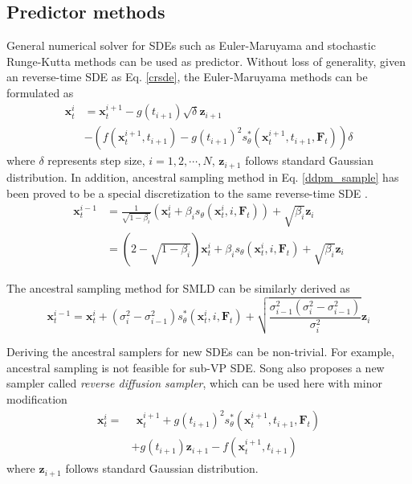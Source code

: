 \subsection{Predictor methods}\label{pred_md}
General numerical solver for SDEs such as Euler-Maruyama and stochastic Runge-Kutta methods can be used as predictor. Without loss of generality, given an reverse-time SDE as Eq. \ref{crsde}, the Euler-Maruyama methods can be formulated as
\begin{equation}\label{euler}
	\begin{aligned}
		\textbf{x}_{t}^{i} &= \textbf{x}_{t}^{i+1} - g(t_{i+1})\sqrt{\delta} \textbf{z}_{i+1}\\
		 &- (f(\textbf{x}_t^{i+1}, t_{i+1}) - g(t_{i+1})^2 s_{\theta}^*(\textbf{x}_t^{i+1}, t_{i+1}, \textbf{F}_t)) \delta
	\end{aligned}
\end{equation}
where $\delta$ represents step size, $i=1,2,\cdots, N$, $\textbf{z}_{i+1}$ follows standard Gaussian distribution.	 In addition, ancestral sampling method in Eq. \ref{ddpm_sample} has been proved to be a special discretization to the same reverse-time SDE \cite{song2020score}.
\begin{equation}\label{ances_vp}
	\begin{aligned}
	\textbf{x}_t^{i-1}&=\frac{1}{\sqrt{1-\beta_i}}(\textbf{x}_t^i + \beta_i s_{\theta}(\textbf{x}_t^i, i, \textbf{F}_t)) + \sqrt{\beta_i}\textbf{z}_i\\
	&=(2-\sqrt{1-\beta_{i}})\textbf{x}_t^{i} + \beta_{i}s_{\theta}(\textbf{x}_t^i, i, \textbf{F}_t) + \sqrt{\beta_{i}}\textbf{z}_i
	\end{aligned}
\end{equation}

The ancestral sampling method for SMLD can be similarly derived as 
\begin{equation}\label{ances_ve}
	\textbf{x}_t^{i-1} = \textbf{x}_t^{i} + (\sigma_i^2 - \sigma_{i-1}^2) s_{\theta}^*(\textbf{x}_t^{i}, i, \textbf{F}_t) + \sqrt{\frac{\sigma_{i-1}^2(\sigma_i^2-\sigma_{i-1}^2)}{\sigma_i^2}} \textbf{z}_{i}
\end{equation}

Deriving the ancestral samplers for new SDEs can be non-trivial. For example, ancestral sampling is not feasible for sub-VP SDE. Song \cite{song2020score} also proposes a new sampler called \textit{reverse diffusion sampler}, which can be used here with minor modification
\begin{equation}\label{reverse_diff}
	\begin{aligned}
		\textbf{x}_{t}^{i} =&~~ \textbf{x}_{t}^{i+1}  + g(t_{i+1})^2 s_{\theta}^*(\textbf{x}_t^{i+1}, t_{i+1}, \textbf{F}_t)\\
		& + g(t_{i+1})\textbf{z}_{i+1} - f(\textbf{x}_t^{i+1}, t_{i+1})
	\end{aligned}
\end{equation}
where $\textbf{z}_{i+1}$ follows standard Gaussian distribution.

